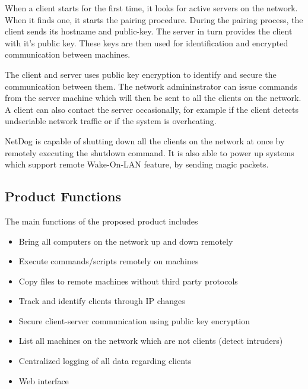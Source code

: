 When a client starts for the first time, it looks for active servers on the
network. When it finds one, it starts the pairing procedure. During the pairing
process, the client sends its hostname and public-key. The server in turn
provides the client with it's public key. These keys are then used for
identification and encrypted communication between machines.

The client and server uses public key encryption to identify and secure the
communication between them. The network admininstrator can issue commands from
the server machine which will then be sent to all the clients on the network.
A client can also contact the server occasionally, for example if the client
detects undseriable network traffic or if the system is overheating.

NetDog is capable of shutting down all the clients on the network at once by
remotely executing the shutdown command. It is also able to power up systems
which support remote Wake-On-LAN feature, by sending magic packets.

\subsection{Product Functions}
The main functions of the proposed product includes \\

\begin{itemize}
\item Bring all computers on the network up and down remotely
\item Execute commands/scripts remotely on machines
\item Copy files to remote machines without third party protocols
\item Track and identify clients through IP changes
\item Secure client-server communication using public key encryption
\item List all machines on the network which are not clients (detect intruders)
\item Centralized logging of all data regarding clients
\item Web interface
\end{itemize}


